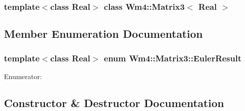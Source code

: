 \subsubsection*{template$<$class Real$>$ class Wm4::Matrix3$<$ Real $>$}



\subsection{Member Enumeration Documentation}
\subsubsection{\setlength{\rightskip}{0pt plus 5cm}template$<$class Real$>$ enum {\bf Wm4::Matrix3::Euler\-Result}}\label{classWm4_1_1Matrix3_e781b5fbd3aff4b99f403d70c44bcba7}


\begin{Desc}
\item[Enumerator: ]\par
\begin{description}
\item[{\em 
EA\_\-UNIQUE\label{classWm4_1_1Matrix3_e781b5fbd3aff4b99f403d70c44bcba7d93b618b8e635db048303ead92a12212}
}]\item[{\em 
EA\_\-NOT\_\-UNIQUE\_\-SUM\label{classWm4_1_1Matrix3_e781b5fbd3aff4b99f403d70c44bcba7fa8c8c83f5beaf9db1f4a2145bb30b7a}
}]\item[{\em 
EA\_\-NOT\_\-UNIQUE\_\-DIF\label{classWm4_1_1Matrix3_e781b5fbd3aff4b99f403d70c44bcba718ec0a7b9b0a0a0a477c47b3a5ea4988}
}]\end{description}
\end{Desc}



\subsection{Constructor \& Destructor Documentation}
